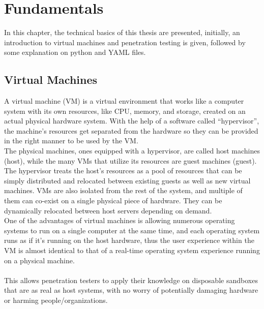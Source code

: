 \chapter{Fundamentals}
In this chapter, the technical basics of this thesis are presented, initially, an introduction to virtual machines and penetration testing is given, followed by some explanation on python and YAML files.

\section{Virtual Machines}
A virtual machine (VM) is a virtual environment that works like a computer system with its own resources, like CPU, memory, and storage, created on an actual physical hardware system. With the help of a software called  “hypervisor”, the machine’s resources get separated from the hardware so they can be provided in the right manner to be used by the VM.\\
The physical machines, ones equipped with a hypervisor, are called host machines (host), while the many VMs that utilize its resources are guest machines (guest). The hypervisor treats the host’s resources as a pool of resources that can be simply distributed and relocated between existing guests as well as new virtual machines. VMs are also isolated from the rest of the system, and multiple of them can co-exist on a single physical piece of hardware. They can be dynamically relocated between host servers depending on demand.\\
One of the advantages of virtual machines is allowing numerous operating systems to run on a single computer at the same time, and each operating system runs as if it’s running on the host hardware, thus the user experience within the VM is almost identical to that of a real-time operating system experience running on a physical machine\cite{vm_redhat}.\\
\\
This allows penetration testers to apply their knowledge on disposable sandboxes that are as real as host systems, with no worry of potentially damaging hardware or harming people/organizations.


